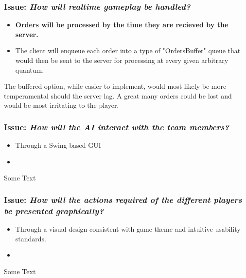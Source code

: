 \subsubsection*{Issue: \textit{How will realtime gameplay be handled?}}

  \begin{itemize}
    \item \textbf{Orders will be processed by the time they are recieved by the server.}
    \item The client will enqueue each order into a type of "OrdersBuffer" queue that would then be sent to the server for processing at every given arbitrary quantum.
  \end{itemize}

The buffered option, while easier to implement, would most likely be more temperamental should the server lag. A great many orders could be lost and would be most irritating to the player.

\subsubsection*{Issue: \textit{How will the AI interact with the team members?}}

  \begin{itemize}
    \item Through a Swing based GUI
    \item 
  \end{itemize}

Some Text

\subsubsection*{Issue: \textit{How will the actions required of the different players be presented graphically?}}

  \begin{itemize}
    \item Through a visual design consistent with game theme and intuitive usability standards.
    \item 
  \end{itemize}

Some Text
